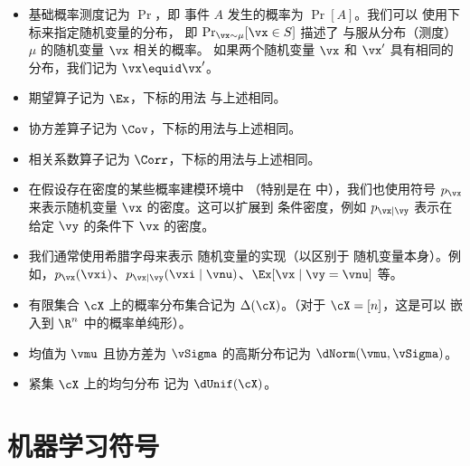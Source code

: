 \begin{itemize}
    \item 基础概率测度记为 \(\Pr\)，即
        事件 \(A\) 发生的概率为 \(\Pr[A]\)。我们可以
        使用下标来指定随机变量的分布，
        即 \(\Pr_{\vx \sim \mu}[\vx \in S]\) 描述了
        与服从分布（测度）$\mu$ 的随机变量 $\vx$ 相关的概率。
        如果两个随机变量 $\vx$ 和 $\vx'$ 具有相同的
        分布，我们记为 $\vx \equid \vx'$。
    \item 期望算子记为 \(\Ex\)，下标的用法
        与上述相同。
    \item 协方差算子记为 \(\Cov\)，下标的用法与上述相同。
    \item 相关系数算子记为 \(\Corr\)，下标的用法与上述相同。
    \item 在假设存在密度的某些概率建模环境中
        （特别是在
         中），我们也使用符号
        $p_{\vx}$ 来表示随机变量 $\vx$ 的密度。这可以扩展到
        条件密度，例如 $p_{\vx \mid \vy}$ 表示在给定 $\vy$ 的条件下 $\vx$
        的密度。
    \item 我们通常使用希腊字母来表示
        随机变量的实现（以区别于
        随机变量本身）。例如，$p_{\vx}(\vxi)$、$p_{\vx \mid
        \vy}(\vxi \mid \vnu)$、$\Ex[\vx \mid \vy=\vnu]$ 等。
    \item 有限集合 %
        \(\cX\) 上的概率分布集合记为
        \(\Delta(\cX)\)。（对于 \(\cX = [n]\)，这是可以
        嵌入到 \(\R^{n}\) 中的概率单纯形）。
    \item 均值为 \(\vmu\) 且协方差为
        \(\vSigma\) 的高斯分布记为 \(\dNorm(\vmu, \vSigma)\)。
    \item 紧集 \(\cX\) 上的均匀分布
        记为 \(\dUnif(\cX)\)。
\end{itemize}

\section*{机器学习符号}

